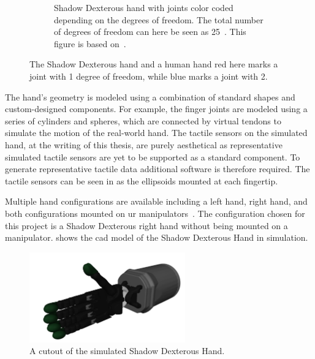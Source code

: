 \begin{figure}[h]
\begin{subfigure}[b]{0.48\textwidth}
		\caption{Shadow Dexterous hand with joints color coded depending on the degrees of freedom. The total number of degrees of freedom can here be seen as \num{25}~\cite{design-and-development-of-a-bilateral-therapeutic-hand-device-for-stroke-rehabilitation}. This figure is based on~\cite{svg-skeleton-hand}.}
		\label{fig:human-hand-skeleton}
	\end{subfigure}
	\caption{The Shadow Dexterous hand and a human hand red here marks a joint with \num{1} degree of freedom, while blue marks a joint with \num{2}.}
	\label{fig:hands-dof}
\end{figure}

The hand's geometry is modeled using a combination of standard shapes and custom-designed components. For example, the finger joints are modeled using a series of cylinders and spheres, which are connected by virtual tendons to simulate the motion of the real-world hand. The tactile sensors on the simulated hand, at the writing of this thesis, are purely aesthetical as representative simulated tactile sensors are yet to be supported as a standard component. To generate representative tactile data additional software is therefore required. The tactile sensors can be seen in  as the ellipsoids mounted at each fingertip. \medskip

Multiple hand configurations are available including a left hand, right hand, and both configurations mounted on \gls{ur} manipulators~\cite{shadow-hand-configurations}. The configuration chosen for this project is a Shadow Dexterous right hand without being mounted on a manipulator.  shows the \gls{cad} model of the Shadow Dexterous Hand in simulation.

\begin{figure}[h]
	\begin{small}
		\begin{center}
			\includegraphics[width=0.6\textwidth]{chapters/system-setup/fig/simulation-robot-hand.png}
		\end{center}
		\caption{A cutout of the simulated Shadow Dexterous Hand.}
		\label{fig:simulated-robot-hand}
	\end{small}
\end{figure}

